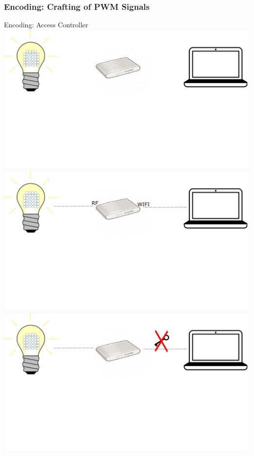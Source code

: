 \documentclass[11pt,t,usepdftitle=false,aspectratio=169]{beamer}
\begin{document}
\subsubsection{Encoding: Crafting of PWM Signals}%
\label{sub:encoding_crafting_of_pwm_signals}
\begin{frame}{Encoding: Access Controller}
     {
        \centering
        \includegraphics{img/AttackController_1.png}
    }
     {
        \centering
        \includegraphics{img/AttackController_2.png}
    }
     {
        \centering
        \includegraphics{img/AttackController_3.png}
}
\end{frame}
\end{document}
